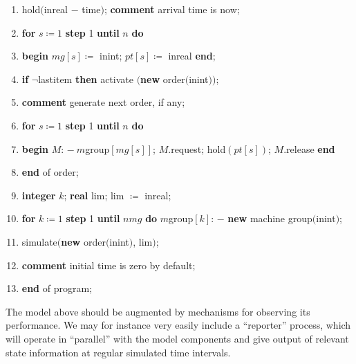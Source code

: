 \begin{enumerate}[nosep, label=\arabic*.]
	\item \label{pg:program-job-shop-15}
	\quad hold$($inreal $-$ time$)$; \textbf{comment} arrival time is now;
	
	\item \label{pg:program-job-shop-16}
	\quad \textbf{for} $s\coloneq 1$ \textbf{step} 1 \textbf{until} $n$ \textbf{do}
	
	\item \label{pg:program-job-shop-17}
	\quad \textbf{begin} $mg[s]\coloneq$ inint; $pt[s]\coloneq$ inreal \textbf{end};
	
	\item \label{pg:program-job-shop-18}
	\quad \textbf{if} $\neg$lastitem \textbf{then} activate $($\textbf{new} order$($inint$))$;
	
	\item \label{pg:program-job-shop-19}
	\quad \textbf{comment} generate next order, if any;
	
	\item \label{pg:program-job-shop-20}
	\quad \textbf{for} $s\coloneq 1$ \textbf{step} 1 \textbf{until} $n$ \textbf{do}
	
	\item \label{pg:program-job-shop-21}
	\quad \textbf{begin} $M$: $-\ m$group$[mg[s]]$; $M$.request; hold$(pt[s])$; $M$.release \textbf{end}
	
	\item \label{pg:program-job-shop-22}
	\textbf{end} of order;
	
	\item \label{pg:program-job-shop-23}
	\textbf{integer} $k$; \textbf{real} lim; lim $\coloneq$ inreal;
	
	\item \label{pg:program-job-shop-24}
	\textbf{for} $k\coloneq 1$ \textbf{step} 1 \textbf{until} $nmg$ \textbf{do} $m$group$[k]$: $-$ \textbf{new} machine group$($inint$)$;
	
	\item \label{pg:program-job-shop-25}
	simulate$($\textbf{new} order$($inint$)$, lim$)$;
	
	\item \label{pg:program-job-shop-26}
	\textbf{comment} initial time is zero by default;
	
	\item \label{pg:program-job-shop-27}
	\textbf{end} of program;
\end{enumerate}

The model above should be augmented by mechanisms for observing its performance. We may for instance very easily include a ``reporter'' process, which will operate in ``parallel'' with the model components and give output of relevant state information at regular simulated time intervals.

